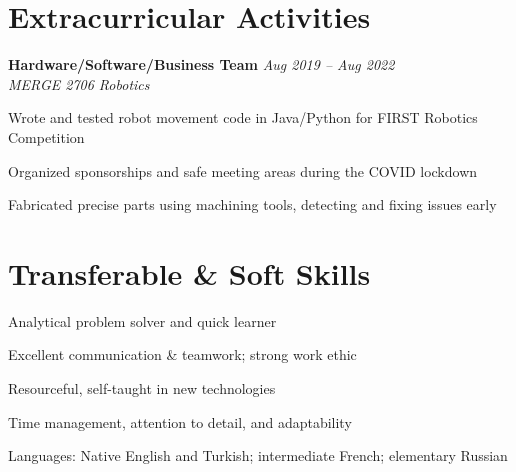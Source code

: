 \documentclass[11pt]{article}
\begin{document}
\section*{Extracurricular Activities}
\begin{small}

\noindent\textbf{Hardware/Software/Business Team} \hfill \textit{Aug 2019 -- Aug 2022} \\
\textit{MERGE 2706 Robotics}
\begin{compactitem}
    \item Wrote and tested robot movement code in Java/Python for FIRST Robotics Competition
    \item Organized sponsorships and safe meeting areas during the COVID lockdown
    \item Fabricated precise parts using machining tools, detecting and fixing issues early
\end{compactitem}

\end{small}


\section*{Transferable \& Soft Skills}
\begin{small}
\begin{compactitem}
    \item Analytical problem solver and quick learner
    \item Excellent communication \& teamwork; strong work ethic
    \item Resourceful, self-taught in new technologies
    \item Time management, attention to detail, and adaptability
    \item Languages: Native English and Turkish; intermediate French; elementary Russian
\end{compactitem}
\end{small}
\vfill


\end{document}
